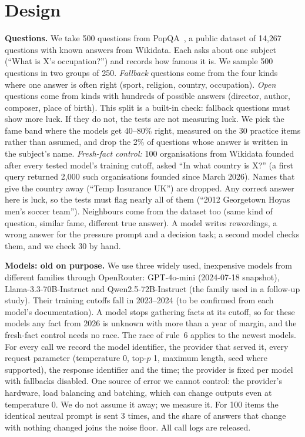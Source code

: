 \documentclass[10pt]{article}
\begin{document}
\section{Design}
\textbf{Questions.} We take 500 questions from PopQA~\cite{popqa}, a public dataset of 14{,}267 questions with known answers from Wikidata. Each asks about one subject (``What is X's occupation?'') and records how famous it is. We sample 500 questions in two groups of 250. \emph{Fallback} questions come from the four kinds where one answer is often right (sport, religion, country, occupation). \emph{Open} questions come from kinds with hundreds of possible answers (director, author, composer, place of birth). This split is a built-in check: fallback questions must show more luck. If they do not, the tests are not measuring luck. We pick the fame band where the models get 40--80\% right, measured on the 30 practice items rather than assumed, and drop the 2\% of questions whose answer is written in the subject's name. \emph{Fresh-fact control:} 100 organisations from Wikidata founded after every tested model's training cutoff, asked ``In what country is X?'' (a first query returned 2{,}000 such organisations founded since March 2026). Names that give the country away (``Temp Insurance UK'') are dropped. Any correct answer here is luck, so the tests must flag nearly all of them (``2012 Georgetown Hoyas men's soccer team''). Neighbours come from the dataset too (same kind of question, similar fame, different true answer). A model writes rewordings, a wrong answer for the pressure prompt and a decision task; a second model checks them, and we check 30 by hand.

\textbf{Models: old on purpose.} We use three widely used, inexpensive models from different families through OpenRouter: GPT-4o-mini (2024-07-18 snapshot), Llama-3.3-70B-Instruct and Qwen2.5-72B-Instruct (the family used in a follow-up study). Their training cutoffs fall in 2023--2024 (to be confirmed from each model's documentation). A model stops gathering facts at its cutoff, so for these models any fact from 2026 is unknown with more than a year of margin, and the fresh-fact control needs no race. The race of rule~6 applies to the newest models. For every call we record the model identifier, the provider that served it, every request parameter (temperature 0, top-$p$ 1, maximum length, seed where supported), the response identifier and the time; the provider is fixed per model with fallbacks disabled. One source of error we cannot control: the provider's hardware, load balancing and batching, which can change outputs even at temperature 0. We do not assume it away; we measure it. For 100 items the identical neutral prompt is sent 3 times, and the share of answers that change with nothing changed joins the noise floor. All call logs are released.
\end{document}
